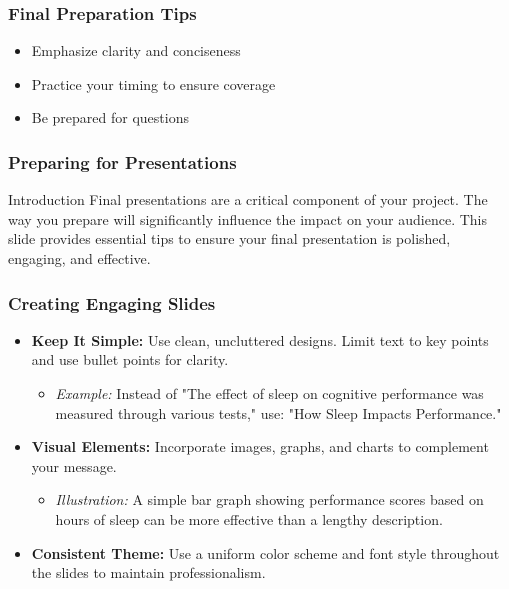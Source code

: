 \documentclass[aspectratio=169]{beamer}
\begin{document}
\begin{frame}[fragile]
    \frametitle{Final Preparation Tips}
    \begin{itemize}
        \item Emphasize clarity and conciseness
        \item Practice your timing to ensure coverage
        \item Be prepared for questions
    \end{itemize}
\end{frame}

\begin{frame}[fragile]
    \frametitle{Preparing for Presentations}
    \begin{block}{Introduction}
        Final presentations are a critical component of your project. 
        The way you prepare will significantly influence the impact on your audience. 
        This slide provides essential tips to ensure your final presentation is polished, engaging, and effective.
    \end{block}
\end{frame}

\begin{frame}[fragile]
    \frametitle{Creating Engaging Slides}
    \begin{itemize}
        \item \textbf{Keep It Simple:} 
        Use clean, uncluttered designs. Limit text to key points and use bullet points for clarity.
        \begin{itemize}
            \item \textit{Example:} Instead of "The effect of sleep on cognitive performance was measured through various tests," use: "How Sleep Impacts Performance."
        \end{itemize}
        \item \textbf{Visual Elements:} 
        Incorporate images, graphs, and charts to complement your message.
        \begin{itemize}
            \item \textit{Illustration:} A simple bar graph showing performance scores based on hours of sleep can be more effective than a lengthy description.
        \end{itemize}
        \item \textbf{Consistent Theme:} 
        Use a uniform color scheme and font style throughout the slides to maintain professionalism.
    \end{itemize}
\end{frame}
\end{document}
